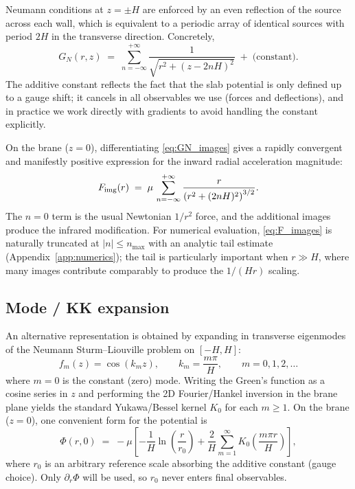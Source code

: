 \documentclass[11pt]{article}
\begin{document}
Neumann conditions at $z=\pm H$ are enforced by an even reflection of the source across each wall,
which is equivalent to a periodic array of identical sources with period $2H$ in the transverse
direction.  Concretely,
\begin{equation}
  G_N(r,z) \;=\; \sum_{n=-\infty}^{+\infty}\frac{1}{\sqrt{r^2+(z-2nH)^2}}
  \;+\; \text{(constant)}.
  \label{eq:GN_images}
\end{equation}
The additive constant reflects the fact that the slab potential is only defined up to a gauge shift;
it cancels in all observables we use (forces and deflections), and in practice we work directly with
gradients to avoid handling the constant explicitly.

On the brane ($z=0$), differentiating \eqref{eq:GN_images} gives a rapidly convergent and manifestly
positive expression for the inward radial acceleration magnitude:
\begin{equation}
  F_{\rm img}(r)
  \;=\; \mu\,\sum_{n=-\infty}^{+\infty}
  \frac{r}{\left(r^2+(2nH)^2\right)^{3/2}}.
  \label{eq:F_images}
\end{equation}
The $n=0$ term is the usual Newtonian $1/r^2$ force, and the additional images produce the infrared
modification.  For numerical evaluation, \eqref{eq:F_images} is naturally truncated at $|n|\le n_{\max}$
with an analytic tail estimate (Appendix~\ref{app:numerics}); the tail is particularly important when
$r\gg H$, where many images contribute comparably to produce the $1/(Hr)$ scaling.

\subsection{Mode / KK expansion}
\label{sec:modes}

An alternative representation is obtained by expanding in transverse eigenmodes of the Neumann
Sturm--Liouville problem on $[-H,H]$:
\begin{equation}
  f_m(z)=\cos(k_m z),\qquad k_m=\frac{m\pi}{H},\qquad m=0,1,2,\dots
  \label{eq:neumann_modes}
\end{equation}
where $m=0$ is the constant (zero) mode.
Writing the Green's function as a cosine series in $z$ and performing the 2D Fourier/Hankel
inversion in the brane plane yields the standard Yukawa/Bessel kernel $K_0$ for each $m\ge 1$.
On the brane ($z=0$), one convenient form for the potential is
\begin{equation}
  \Phi(r,0)
  \;=\; -\mu\left[
    -\frac{1}{H}\ln\!\left(\frac{r}{r_0}\right)
    + \frac{2}{H}\sum_{m=1}^{\infty}
      K_0\!\left(\frac{m\pi r}{H}\right)
  \right],
  \label{eq:Phi_modes}
\end{equation}
where $r_0$ is an arbitrary reference scale absorbing the additive constant (gauge choice).
Only $\partial_r\Phi$ will be used, so $r_0$ never enters final observables.
\end{document}
